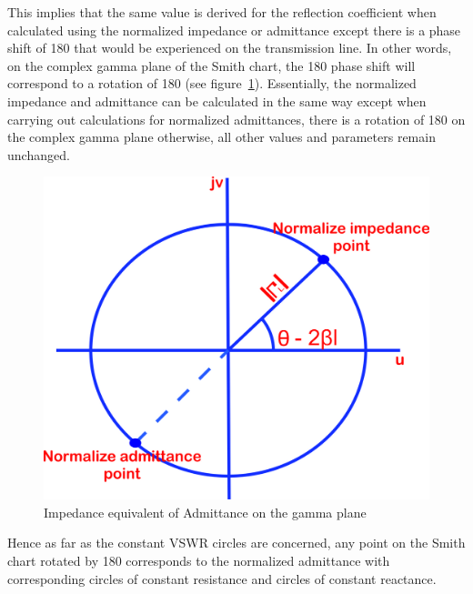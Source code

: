 This implies that the same value is derived for the reflection coefficient when calculated using the normalized impedance or admittance except there is a phase shift of 180\textdegree\; that would be experienced on the transmission line. In other words, on the complex gamma plane of the Smith chart, the 180\textdegree\; phase shift will correspond to a rotation of 180\textdegree\; (see figure~\ref{fig:zstyuiou}). Essentially, the normalized impedance and admittance can be calculated in the same way except when carrying out calculations for normalized admittances, there is a rotation of 180\textdegree\; on the complex gamma plane otherwise, all other values and parameters remain unchanged.
\begin{figure}[h]
\centering
\includegraphics[width=0.6\linewidth]{./graphics/zstyuiou}
\caption{Impedance equivalent of Admittance on the gamma plane}
\label{fig:zstyuiou}
\end{figure}

Hence as far as the constant VSWR circles are concerned, any point on the Smith chart rotated by 180\textdegree\; corresponds to the normalized admittance with corresponding circles of constant resistance and circles of constant reactance. 

